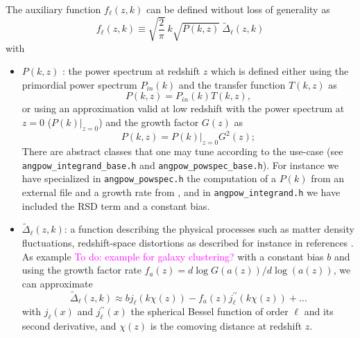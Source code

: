 \documentclass[\docopts]{\docclass}
\newcommand{\todo}[1]{\textcolor{magenta}{To do: #1}}
\begin{document}
The auxiliary function $f_\ell(z,k)$ can be defined without loss of generality as 
\begin{equation}
f_\ell(z,k) \equiv  \sqrt{\frac{2}{\pi}}\  k \sqrt{P(k,z)}\ \widetilde{\Delta}_\ell(z,k)\label{eq-fell-func}
\end{equation}
with 
\begin{itemize}
\item  $P(k,z)$ : the power spectrum at redshift $z$ which is defined either using the primordial power spectrum $P_{in}(k)$ and the transfer function $T(k,z)$ as
\begin{equation}
P(k,z) = P_{in}(k) T(k,z),
\end{equation} 
or using an approximation valid at low redshift  with the power spectrum at $z=0$ ($P(k)|_{z=0}$) and the growth factor $G(z)$ as
\begin{equation}
P(k,z) = P(k)|_{z=0} G^2(z);
\end{equation} 
There are abstract classes that one may tune according to the use-case (see \texttt{angpow\_integrand\_base.h} and \texttt{angpow\_powspec\_base.h}). For instance we have specialized in \texttt{angpow\_powspec.h} the computation of a $P(k)$ from an external 
file and a growth rate from \citet{1991MNRAS.251..128L, 1992ARA&A..30..499C}, and in \texttt{angpow\_integrand.h} we have included the RSD term and a constant bias.
\item $\widetilde{\Delta}_\ell(z,k)$: a function describing the physical processes such as matter density fluctuations, redshift-space distortions as described for instance in references \citet{2008cmb..book.....D,2009PhRvD..80h3514Y,2010PhRvD..82h3508Y, 2011PhRvD..84d3516C,2011PhRvD..84f3505B}. As example \todo{example for galaxy clustering?} with a constant bias $b$ and using the growth factor rate $f_a(z) = d\log G(a(z))/d\log(a(z))$, we can approximate
\begin{equation}
 \widetilde{\Delta}_\ell(z,k) \approx b j_\ell(k \chi(z)) - f_a(z) j_\ell^{\prime\prime}(k \chi(z)) + \dots
\end{equation}
with $j_\ell(x)$ and $j_\ell^{\prime\prime}(x)$ the spherical Bessel function of order $\ell$ and its second derivative, and $\chi(z)$ is the comoving distance at redshift $z$.
\end{itemize}
\end{document}
